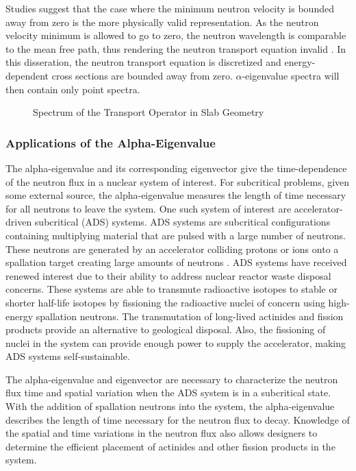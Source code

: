 Studies suggest that the case where the minimum neutron velocity is bounded away from zero is the more physically valid representation. As the neutron velocity minimum is allowed to go to zero, the neutron wavelength is comparable to the mean free path, thus rendering the neutron transport equation invalid \cite{duderstadt_nuclear_1976}. In this disseration, the neutron transport equation is discretized and energy-dependent cross sections are bounded away from zero. $\alpha$-eigenvalue spectra will then contain only point spectra.

\begin{figure}
	\centering
	\resizebox{0.5\textwidth}{!}{

	}
	\caption{Spectrum of the Transport Operator in Slab Geometry}
	\label{fig:AlphaEigSpectrum}
\end{figure}

\subsubsection{Applications of the Alpha-Eigenvalue}

The alpha-eigenvalue and its corresponding eigenvector give the time-dependence of the neutron flux in a nuclear system of interest. For subcritical problems, given some external source, the alpha-eigenvalue measures the length of time necessary for all neutrons to leave the system. One such system of interest are accelerator-driven subcritical (ADS) systems. ADS systems are subcritical configurations containing multiplying material that are pulsed with a large number of neutrons. These neutrons are generated by an accelerator colliding protons or ions onto a spallation target creating large amounts of neutrons \cite{abderrahim2001myrrha}. ADS systems have received renewed interest due to their ability to address nuclear reactor waste disposal concerns. These systems are able to transmute radioactive isotopes to stable or shorter half-life isotopes by fissioning the radioactive nuclei of concern using high-energy spallation neutrons. The transmutation of long-lived actinides and fission products provide an alternative to geological disposal. Also, the fissioning of nuclei in the system can provide enough power to supply the accelerator, making ADS systems self-sustainable.

The alpha-eigenvalue and eigenvector are necessary to characterize the neutron flux time and spatial variation when the ADS system is in a subcritical state. With the addition of spallation neutrons into the system, the alpha-eigenvalue describes the length of time necessary for the neutron flux to decay. Knowledge of the spatial and time variations in the neutron flux also allows designers to determine the efficient placement of actinides and other fission products in the system.

